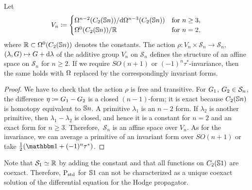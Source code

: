 \documentclass[\MainFolder/Text.tex]{subfiles}
\newcommand{\Soln}{\mathcal{S}}
\begin{document}
\begin{Proposition}\label{Prop:SpaceOfSolnSn}
Let
$$ V_n\coloneqq \begin{cases}
\Omega^{n-2}(C_2(\mathbb{S}{n}))/\mathrm{d} \Omega^{n-3}(C_2(\mathbb{S}{n})) & \text{for } n\ge 3, \\
\Omega^{0}(C_2(\mathbb{S}{n}))/\mathbb{R} & \text{for }n=2,
\end{cases}$$
where $\mathbb{R}\subset\Omega^0(C_2(\mathbb{S}{n}))$ denotes the constants. The action $\rho: V_n \times \Soln_n \rightarrow \Soln_n$, $(\lambda,G)\mapsto G + \mathrm{d}\lambda$ of the additive group $V_n$ on $\Soln_n$ defines the structure of an affine space on $\Soln_n$ for $n\ge 2$. If we require $SO(n+1)$ or $(-1)^n\tau^*$-invariance, then the same holds with $\Omega$ replaced by the correspondingly invariant forms.
\end{Proposition}
\begin{proof}
We have to check that the action $\rho$ is free and transitive. For $G_1$, $\GKer_2\in \Soln_n$, the difference $\eta \coloneqq G_1 - G_2$ is a closed $(n-1)$-form; it is exact because $C_2(\mathbb{S}{n})$ is homotopy equivalent to $\mathbb{S}{n}$. A primitive $\lambda_1$ is an $n-2$ form. If $\lambda_2$ is another primitive, then $\lambda_1 - \lambda_2$ is closed, and hence it is a constant for $n=2$ and an exact form for $n \ge 3$. Therefore,~$\Soln_n$ is an affine space over $V_n$. As for the invariance, we can average a primitive of an invariant form over $SO(n+1)$ or take $\frac{1}{2}(\Id + (-1)^n \tau^*)$.
\end{proof}

Note that $\Soln_1 \simeq \R$ by adding the constant and that all functions on $C_2(\mathbb{S}{1})$ are coexact. Therefore, $\mathrm{P}_{\mathrm{std}}$ for $\mathbb{S}{1}$ can not be characterized as a unique coexact solution of the differential equation for the Hodge propagator.
\end{document}

